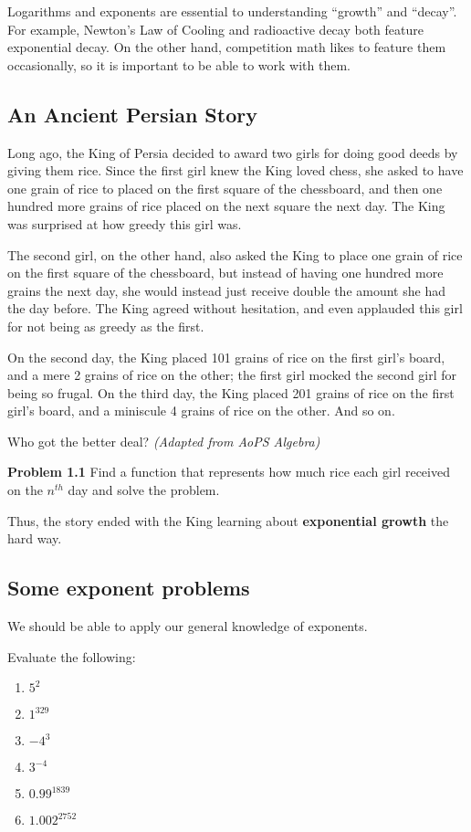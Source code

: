 	   Logarithms and exponents are essential to understanding ``growth'' and ``decay''. For example, Newton's Law of Cooling and radioactive decay both feature exponential decay. On the other hand, competition math likes to feature them occasionally, so it is important to be able to work with them.
  \subsection{An Ancient Persian Story}
		Long ago, the King of Persia decided to award two girls for doing good deeds by giving them rice. Since the first girl knew the King loved chess, she asked to have one grain of rice to placed on the first square of the chessboard, and then one hundred more grains of rice placed on the next square the next day. The King was surprised at how greedy this girl was.\par
		The second girl, on the other hand, also asked the King to place one grain of rice on the first square of the chessboard, but instead of having one hundred more grains the next day, she would instead just receive double the amount she had the day before. The King agreed without hesitation, and even applauded this girl for not being as greedy as the first.\par
		On the second day, the King placed 101 grains of rice on the first girl's board, and a mere 2 grains of rice on the other; the first girl mocked the second girl for being so frugal. On the third day, the King placed 201 grains of rice on the first girl's board, and a miniscule 4 grains of rice on the other. And so on.\par
		Who got the better deal? \textit{(Adapted from AoPS Algebra)} \par
		
		\textbf{Problem 1.1} Find a function that represents how much rice each girl received on the $n^{th}$ day and solve the problem. \vspace{2.2in}
		
		Thus, the story ended with the King learning about \textbf{exponential growth} the hard way.
	    \clearpage
	\subsection{Some exponent problems}
	We should be able to apply our general knowledge of exponents. \par
	\begin{problem} Evaluate the following: \end{problem}
		\begin{multicols}{2}
			\begin{enumerate}
				\item $5^{2}$
				\item $1^{329}$
				\item $-4^{3}$
				\item $3^{-4}$
				\item $0.99^{1839}$
				\item $1.002^{2752}$
			\end{enumerate}
		\end{multicols}
	
